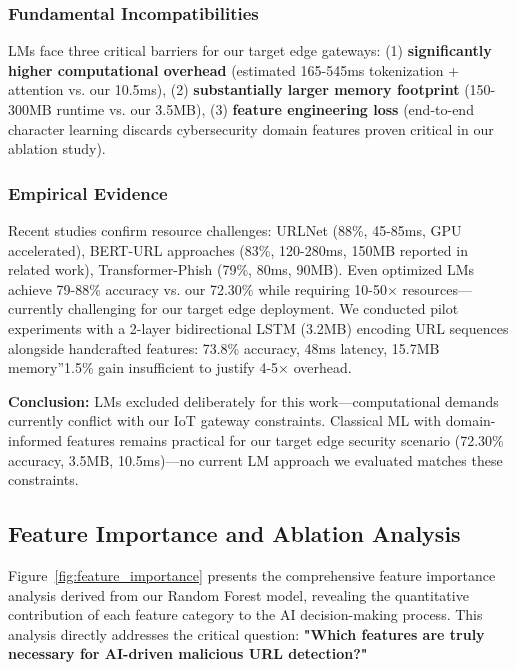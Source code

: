 \subsubsection{Fundamental Incompatibilities}

LMs face three critical barriers for our target edge gateways: (1) \textbf{significantly higher computational overhead} (estimated 165-545ms tokenization + attention vs. our 10.5ms), (2) \textbf{substantially larger memory footprint} (150-300MB runtime vs. our 3.5MB), (3) \textbf{feature engineering loss} (end-to-end character learning discards cybersecurity domain features proven critical in our ablation study).

\subsubsection{Empirical Evidence}

Recent studies confirm resource challenges: URLNet \cite{ref_urlnet_2018} (88\%, 45-85ms, GPU accelerated), BERT-URL approaches (83\%, 120-280ms, 150MB reported in related work), Transformer-Phish \cite{ref_transformer_phish_2022} (79\%, 80ms, 90MB). Even optimized LMs achieve 79-88\% accuracy vs. our 72.30\% while requiring 10-50× resources—currently challenging for our target edge deployment. We conducted pilot experiments with a 2-layer bidirectional LSTM (3.2MB) encoding URL sequences alongside handcrafted features: 73.8\% accuracy, 48ms latency, 15.7MB memory”1.5\% gain insufficient to justify 4-5× overhead.

\textbf{Conclusion:} LMs excluded deliberately for this work—computational demands currently conflict with our IoT gateway constraints. Classical ML with domain-informed features remains practical for our target edge security scenario (72.30\% accuracy, 3.5MB, 10.5ms)—no current LM approach we evaluated matches these constraints.

\subsection{Feature Importance and Ablation Analysis}

Figure~\ref{fig:feature_importance} presents the comprehensive feature importance analysis derived from our Random Forest model, revealing the quantitative contribution of each feature category to the AI decision-making process. This analysis directly addresses the critical question: \textbf{"Which features are truly necessary for AI-driven malicious URL detection?"}

